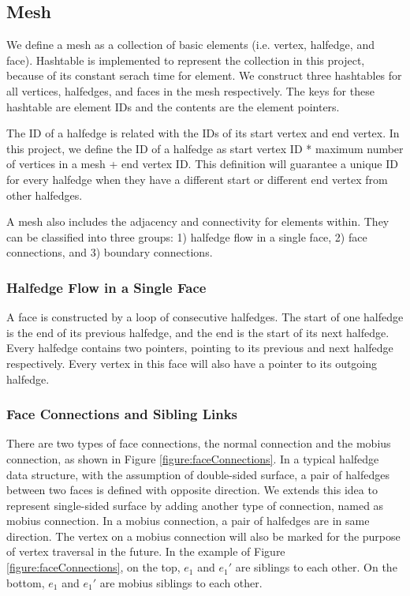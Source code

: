 \documentclass[12pt]{article}
\begin{document}
\subsection{Mesh}
We define a mesh as a collection of basic elements (i.e. vertex, halfedge, and face). Hashtable is implemented to represent the collection in this project, because of its constant serach time for element. We construct three hashtables for all vertices, halfedges, and faces in the mesh respectively. The keys for these hashtable are element IDs and the contents are the element pointers.

The ID of a halfedge is related with the IDs of its start vertex and end vertex. In this project, we define the ID of a halfedge as start vertex ID * maximum number of vertices in a mesh + end vertex ID. This definition will guarantee a unique ID for every halfedge when they have a different start or different end vertex from other halfedges. 

A mesh also includes the adjacency and connectivity for elements within. They can be classified into three groups: 1) halfedge flow in a single face, 2) face connections, and 3) boundary connections.

\subsubsection{Halfedge Flow in a Single Face}
A face is constructed by a loop of consecutive halfedges. The start of one halfedge is the end of its previous halfedge, and the end is the start of its next halfedge. Every halfedge contains two pointers, pointing to its previous and next halfedge respectively. Every vertex in this face will also have a pointer to its outgoing halfedge.

\subsubsection{Face Connections and Sibling Links}

There are two types of face connections, the normal connection and the mobius connection, as shown in Figure \ref{figure:faceConnections}. In a typical halfedge data structure, with the assumption of double-sided surface, a pair of halfedges between two faces is defined with opposite direction. We extends this idea to represent single-sided surface by adding another type of connection, named as mobius connection. In a mobius connection, a pair of halfedges are in same direction. The vertex on a mobius connection will also be marked for the purpose of vertex traversal in the future. In the example of Figure \ref{figure:faceConnections}, on the top, $e_1$ and $e_1'$ are siblings to each other. On the bottom, $e_1$ and $e_1'$ are mobius siblings to each other. 
\end{document}
